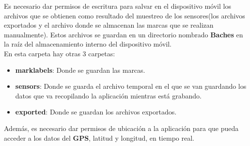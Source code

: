 	\indent Es necesario dar permisos de escritura para salvar en el dispositivo móvil los archivos que se obtienen como resultado del 
	muestreo de los sensores(los archivos exportados y el archivo donde se almacenan las marcas que se realizan manualmente). Estos archivos
	se guardan en un directorio nombrado \textbf{Baches} en la raíz del almacenamiento interno del dispositivo móvil.\\
	\indent En esta carpeta hay otras 3 carpetas:

	\begin{itemize}
		\item \textbf{mark\textunderscore labels}: Donde se guardan las marcas.
		\item \textbf{sensors}: Donde se guarda el archivo temporal en el que se van guardando los datos que va recopilando la aplicación
			mientras está grabando.
		\item \textbf{exported}: Donde se guardan los archivos exportados.
	\end{itemize}

	Además, es necesario dar permisos de ubicación a la aplicación para que pueda acceder a los datos del \textbf{GPS}, latitud y longitud,
	en tiempo real.

